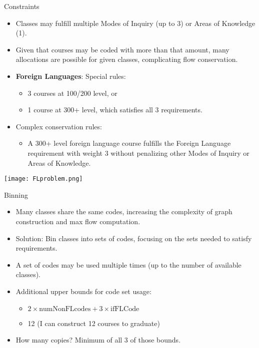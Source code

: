 \documentclass{beamer}
\begin{document}
\begin{frame}{Constraints}
    \begin{itemize}
        \item Classes may fulfill multiple Modes of Inquiry (up to 3) or Areas of Knowledge (1).
        \item Given that courses may be coded with more than that amount, many allocations are possible for given classes, complicating flow conservation.
        \item \textbf{Foreign Languages}: Special rules:
        \begin{itemize}
            \item 3 courses at 100/200 level, or
            \item 1 course at 300+ level, which satisfies all 3 requirements.
        \end{itemize}
        \item Complex conservation rules:
        \begin{itemize}
            \item A 300+ level foreign language course fulfills the Foreign Language requirement with weight 3 without penalizing other Modes of Inquiry or Areas of Knowledge.
        \end{itemize}
    \end{itemize}
\end{frame}

\begin{frame}
    \centering
    \texttt{[image: FLproblem.png]}
\end{frame}

\begin{frame}{Binning}
    \begin{itemize}
        \item Many classes share the same codes, increasing the complexity of graph construction and max flow computation.
        \item Solution: Bin classes into sets of codes, focusing on the sets needed to satisfy requirements.
        \item A set of codes may be used multiple times (up to the number of available classes).
        \item Additional upper bounds for code set usage:
        \begin{itemize}
            \item \( 2 \times \text{numNonFLcodes} + 3 \times \text{ifFLCode} \)
            \item 12 (I can construct 12 courses to graduate)
        \end{itemize}
        \item How many copies? Minimum of all 3 of those bounds.
    \end{itemize}
\end{frame}
\end{document}
